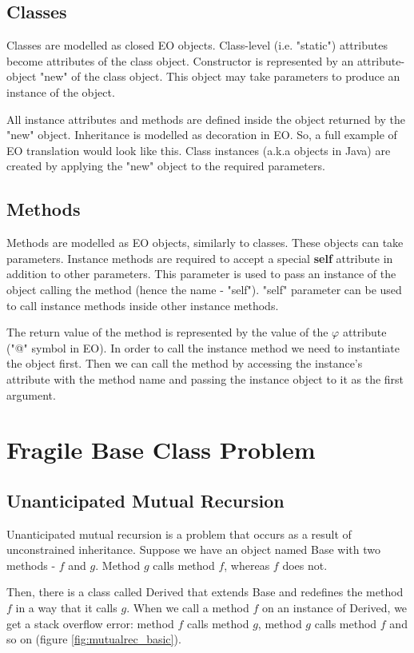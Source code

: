 \subsection{Classes}
Classes are modelled as closed EO objects. Class-level (i.e. "static") attributes become attributes of the class object. Constructor is represented by an attribute-object "new" of the class object. This object may take parameters to produce an instance of the object.

All instance attributes and methods are defined inside the object returned by the "new" object. Inheritance is modelled as decoration in EO. So, a full example of EO translation would look like this. Class instances (a.k.a objects in Java) are created
by applying the "new" object to the required parameters.

\subsection{Methods}
Methods are modelled as EO objects, similarly to classes. These objects can take parameters.
Instance methods are required to accept a special \textbf{self} attribute in addition to other parameters. This parameter is used to pass an instance of the object calling the method (hence the name - "self").
"self" parameter can be used to call instance methods inside other instance methods.

The return value of the method is represented by the value of the $\varphi$ attribute ("@" symbol in EO). In order to call the instance method we need to instantiate the object first. Then we can call the method by accessing the instance's attribute with the method name and passing the instance object to it as the first argument.




\section{Fragile Base Class Problem}

\subsection{Unanticipated Mutual Recursion}
Unanticipated mutual recursion is a problem that occurs as a result of unconstrained inheritance. Suppose we have an object named Base with two methods - $f$ and $g$. Method $g$ calls method $f$, whereas $f$ does not.


Then, there is a class called Derived that extends Base and redefines the method $f$ in a way that it calls $g$. When we call a method $f$ on an instance of Derived, we get a stack overflow error: method $f$ calls method $g$, method $g$ calls method $f$ and so on (figure \ref{fig:mutualrec_basic}).

